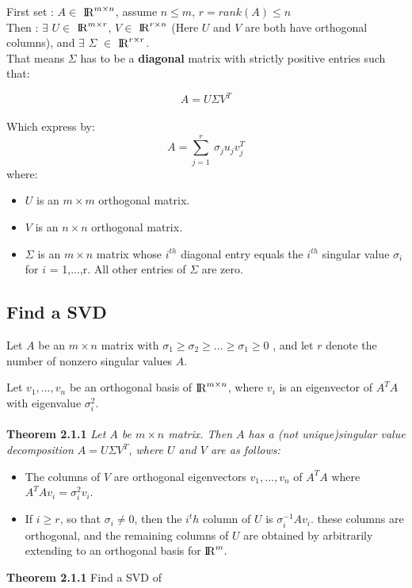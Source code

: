 \documentclass{article}
\begin{document}
First set :
$A \in$
${\rm I\!R}^{m \times n}$, assume $n \leq m$,
$r = rank(A) \leq n$
\\
Then : 
$\exists$
$U \in $
${\rm I\!R}^{m \times r}$,
$V \in$
${\rm I\!R}^{r \times n}$
(Here $U$ and $V$ are both have orthogonal columns), and
$\exists$
$\Sigma$
$\in$
${\rm I\!R}^{r \times r}$.
\\
That means
$\Sigma$
has to be a \textbf{diagonal} matrix with strictly positive entries such that:

\begin{equation}
	A = U \Sigma V^T
\end{equation}
\\
Which express by:
\begin{equation}
	A = \sum_{j=1}^{r} \ \sigma_j u_j v_j^T
\end{equation}
where:
\begin{itemize}
	\item $U$ is an $m \times m$ orthogonal matrix.
	\item $V$ is an $n \times n$ orthogonal matrix.
	\item $\Sigma$ is an $m \times n$ matrix whose $i^{th}$ diagonal entry equals the $i^{th}$ singular value $\sigma_i$ for $i$ = 1,...,r. All other entries of $\Sigma$ are zero.
\end{itemize}

\subsection{Find a SVD}
Let $A$ be an 
$m \times n$
matrix with 
$\sigma_1 \geq \sigma_2 \geq ... \geq \sigma_1 \geq 0$
, and let
$r$
denote the number of nonzero singular values
$A$.
\vspace{1mm}

Let 
$v_1,...,v_n$
be an orthogonal basis of
${\rm I\!R}^{m \times n}$,
where
$v_i$ is an eigenvector of 
$A^TA$
with eigenvalue
$\sigma^2_i$.
\\~\\
\textbf{Theorem 2.1.1}
\textit{Let $A$ be $m \times n$ matrix. Then $A$ has a (not unique)singular value decomposition $A = U \Sigma V^T$, where  $U$ and $V$ are as follows:}
\begin{itemize}
	\item The columns of $V$ are orthogonal eigenvectors $v_1, ... , v_n$ of $A^TA$ where $A^TAv_i= \sigma_i^2 v_i$.
	\item If $i \geq r$, so that $\sigma_i \not= 0$, then the $i^th$ column of $U$ is $\sigma_i^{-1} Av_i $. these columns are orthogonal, and the remaining columns of $U$ are obtained by arbitrarily extending to an orthogonal basis for ${\rm I\!R}^{m}.$
\end{itemize}
\textbf{Theorem 2.1.1} Find a SVD of 
\end{document}
